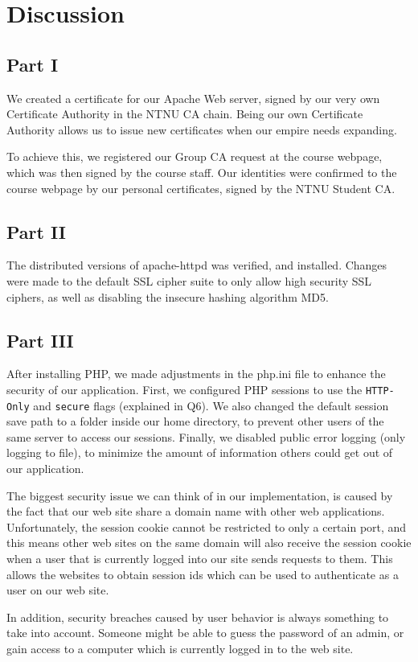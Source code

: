 \section{Discussion}

\subsection{Part I}

We created a certificate for our Apache Web server, signed by our very own Certificate Authority in the NTNU CA chain.
Being our own Certificate Authority allows us to issue new certificates when our empire needs expanding.

To achieve this, we registered our Group CA request at the course webpage, which was then signed by the course staff.
Our identities were confirmed to the course webpage by our personal certificates, signed by the NTNU Student CA.

\subsection{Part II}

The distributed versions of apache-httpd was verified, and installed.
Changes were made to the default SSL cipher suite to only allow high security SSL ciphers, as well as disabling the insecure hashing algorithm MD5.

\subsection{Part III}

After installing PHP, we made adjustments in the php.ini file to enhance the security of our application.
First, we configured PHP sessions to use the \verb/HTTP-Only/ and \verb/secure/ flags (explained in Q6).
We also changed the default session save path to a folder inside our home directory, to prevent other users of the same server to access our sessions.
Finally, we disabled public error logging (only logging to file), to minimize the amount of information others could get out of our application.

The biggest security issue we can think of in our implementation, is caused by the fact that our web site share a domain name with other web applications.
Unfortunately, the session cookie cannot be restricted to only a certain port, and this means other web sites on the same domain will also receive the session cookie when a user that is currently logged into our site sends requests to them.
This allows the websites to obtain session ids which can be used to authenticate as a user on our web site.

In addition, security breaches caused by user behavior is always something to take into account\cite{comic}.
Someone might be able to guess the password of an admin, or gain access to a computer which is currently logged in to the web site.
